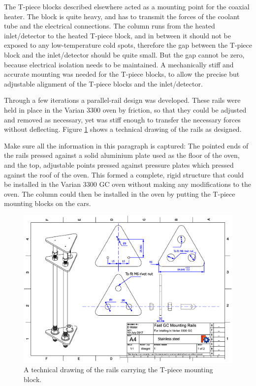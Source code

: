 The T-piece blocks described elsewhere acted as a mounting point for the coaxial heater. The block is
quite heavy, and has to transmit the forces of the coolant tube and the
electrical connections. The column runs from the heated inlet/detector to the
heated T-piece block, and in between it should not be exposed to any
low-temperature cold spots, therefore the gap between the T-piece block and the
inlet/detector should be quite small. But the gap cannot be zero, because
electrical isolation needs to be maintained. A mechanically stiff and accurate
mounting was needed for the T-piece blocks, to allow the precise but
adjustable alignment of the T-piece blocks and the inlet/detector.

Through a few iterations a parallel-rail design was developed. These rails were
held in place in the Varian 3300 oven by friction, so that they could be
adjusted and removed as necessary, yet was stiff enough to transfer the
necessary forces without deflecting. Figure \ref{fig:RailsDrawing} shows a
technical drawing of the rails as designed. 

\begin{todo}

Make sure all the information in this paragraph is captured: The pointed ends of
the rails pressed against a solid aluminium plate used as the floor of the oven,
and the top, adjustable points pressed against pressure plates which pressed
against the roof of the oven. This formed a complete, rigid structure that could
be installed in the Varian 3300 GC oven without making any modifications to the
oven. The column could then be installed in the oven by putting the T-piece
mounting blocks on the cars.

\end{todo}

\begin{figure}
	\centering
	\includegraphics[angle=90, origin=c, scale=0.75]{Figures/RailsDrawing.pdf}
	\decoRule	
\caption[Technical drawing of coaxial heater mounting rails]{\label{fig:RailsDrawing}A technical drawing of the rails carrying the T-piece mounting block.} 
	
\end{figure}

